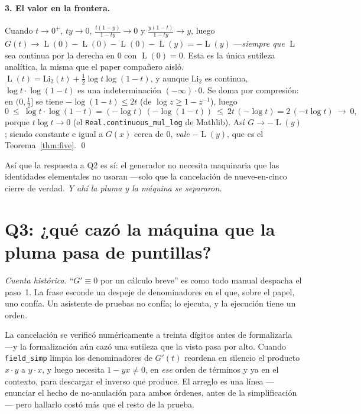 \documentclass[11pt]{article}
\newcommand{\lean}[1]{\texttt{#1}}
\newcommand{\Li}{\mathrm{Li}_2}
\DeclareMathOperator{\Lrog}{L}
\begin{document}
\paragraph{3. El valor en la frontera.} Cuando $t\to0^+$, $ty\to0$,
$\tfrac{t(1-y)}{1-ty}\to0$ y $\tfrac{y(1-t)}{1-ty}\to y$, luego
$G(t)\to\Lrog(0)-\Lrog(0)-\Lrog(0)-\Lrog(y)=-\Lrog(y)$ ---\emph{siempre que} $\Lrog$ sea
continua por la derecha en $0$ con $\Lrog(0)=0$. Esta es la \'unica sutileza anal\'itica, la
misma que el paper compa\~nero aisl\'o. $\Lrog(t)=\Li(t)+\tfrac12\log t\log(1-t)$, y aunque
$\Li$ es continua, $\log t\cdot\log(1-t)$ es una indeterminaci\'on $(-\infty)\cdot 0$. Se doma
por compresi\'on: en $(0,\tfrac12]$ se tiene $-\log(1-t)\le 2t$ (de $\log z\ge1-z^{-1}$),
luego
\[
  0\ \le\ \log t\cdot\log(1-t)=(-\log t)\,(-\log(1-t))\ \le\ 2t\,(-\log t)=2\,(-t\log t)
  \ \longrightarrow\ 0,
\]
porque $t\log t\to0$ (el \lean{Real.continuous\_mul\_log} de Mathlib). As\'i $G\to-\Lrog(y)$;
siendo constante e igual a $G(x)$ cerca de $0$, \emph{vale} $-\Lrog(y)$, que es el
Teorema~\ref{thm:five}. \qed

As\'i que la respuesta a Q2 es s\'i: el generador no necesita maquinaria que las identidades
elementales no usaran ---solo que la cancelaci\'on de nueve-en-cinco cierre de verdad.
\emph{Y ah\'i la pluma y la m\'aquina se separaron.}

\section{Q3: ¿qu\'e caz\'o la m\'aquina que la pluma pasa de puntillas?}\label{sec:caught}

\emph{Cuenta hist\'orica.} ``$G'\equiv0$ por un c\'alculo breve'' es como todo manual despacha
el paso~1. La frase esconde un despeje de denominadores en el que, sobre el papel, uno
conf\'ia. Un asistente de pruebas no conf\'ia; lo ejecuta, y la ejecuci\'on tiene un orden.

La cancelaci\'on se verific\'o num\'ericamente a treinta d\'igitos antes de formalizarla ---y
la formalizaci\'on a\'un caz\'o una sutileza que la vista pasa por alto. Cuando
\lean{field\_simp} limpia los denominadores de $G'(t)$ reordena en silencio el producto
$x\cdot y$ a $y\cdot x$, y luego necesita $1-yx\neq0$, en \emph{ese} orden de t\'erminos y ya
en el contexto, para descargar el inverso que produce. El arreglo es una l\'inea ---enunciar
el hecho de no-anulaci\'on para ambos \'ordenes, antes de la simplificaci\'on--- pero hallarlo
cost\'o m\'as que el resto de la prueba.
\end{document}
